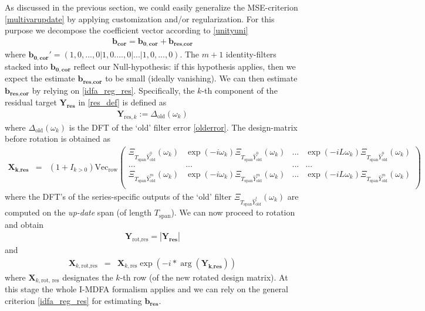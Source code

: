 \documentclass[11pt]{article}
\begin{document}
As discussed in the previous section, we could easily generalize the MSE-criterion \ref{multivarupdate} by applying customization and/or regularization. For this purpose we decompose the coefficient vector according to \ref{unityuni} 
\begin{eqnarray*}
\mathbf{b_{\textrm{cor}}}=\mathbf{b_{0,\textrm{cor}}}+\mathbf{b_{\textrm{res,cor}}}
\end{eqnarray*} 
where $\mathbf{b_{0,\textrm{cor}}}'=(1,0,...,0|1,0....,0|...|1,0,...,0)$. The $m+1$ identity-filters stacked into $\mathbf{b_{0,\textrm{cor}}}$ reflect our Null-hypothesis: if this hypothesis applies, then we expect the estimate $\mathbf{b_{\textrm{res,cor}}}$ to be small (ideally vanishing). We can then estimate $\mathbf{b_{\textrm{res,cor}}}$ by relying on \ref{idfa_reg_res}.
Specifically, the $k$-th component of the residual target $\mathbf{Y_{\textrm{res}}}$ in \ref{res_def} is defined as
\begin{eqnarray*}
\mathbf{Y}_{\textrm{res},k}:=\Delta_{\textrm{old}}(\omega_k)
\end{eqnarray*}
where $\Delta_{\textrm{old}}(\omega_k)$ is the DFT of the `old' filter error \ref{olderror}. 
The design-matrix before rotation is obtained as 
\begin{eqnarray*}
\mathbf{X_\textrm{k,res}}&=&(1+I_{k>0})\textrm{Vec}_\textrm{row}\left(\begin{array}{ccccc} \Xi_{T_{\textrm{span}}\hat{Y}_{\textrm{old}}^0}(\omega_k)& \exp(-i\omega_k)\Xi_{T_{\textrm{span}}\hat{Y}_{\textrm{old}}^0}(\omega_k)&...& \exp(-iL\omega_k)\Xi_{T_{\textrm{span}}\hat{Y}_{\textrm{old}}^0}(\omega_k)\\
...&...&...&...\\
\Xi_{T_{\textrm{span}}\hat{Y}_{\textrm{old}}^m}(\omega_k)& \exp(-i\omega_k)\Xi_{T_{\textrm{span}}\hat{Y}_{\textrm{old}}^m}(\omega_k)&...& \exp(-iL\omega_k)\Xi_{T_{\textrm{span}}\hat{Y}_{\textrm{old}}^m}(\omega_k)\\
\end{array}\right)
\end{eqnarray*}
where the DFT's of the series-specific outputs of the `old' filter $\Xi_{T_{\textrm{span}}\hat{Y}_{\textrm{old}}^l}(\omega_k)$  are computed on the \emph{up-date} span (of length $T_{\textrm{span}}$). We can now proceed to rotation and obtain
\begin{eqnarray*}
 \mathbf{Y}_{\textrm{rot,res}}=\left|\mathbf{Y_\textrm{res}}\right|
\end{eqnarray*}
and
\begin{eqnarray*}
\mathbf{X}_{k,\textrm{rot,res}}&=&\mathbf{X}_{k,\textrm{res}} \exp\left(-i*\arg\left(\mathbf{Y_{\textrm{k,res}}}  \right)\right)
\end{eqnarray*}
where $\mathbf{X}_{k,\textrm{rot, res}}$ designates the $k$-th row (of the new rotated design matrix). At this stage the whole I-MDFA formalism applies and we can rely on the general criterion \ref{idfa_reg_res} for estimating $\mathbf{b_{\textrm{res}}}$.\\
\end{document}
